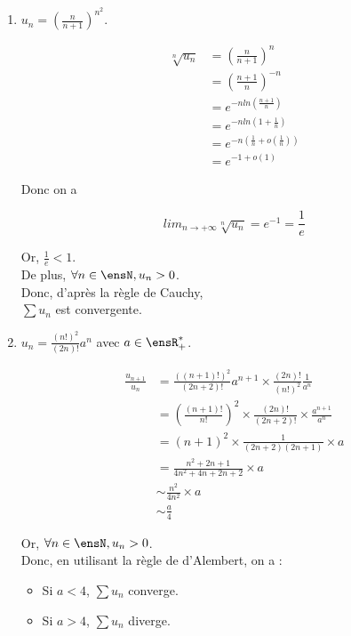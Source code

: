 \begin{enumerate}
    \clearpage

    \item $\displaystyle u_n = (\frac{n}{n + 1})^{n^2}$.

    \exobox
    {
        \begin{align*}
            \sqrt[n]{u_n} &= (\frac{n}{n + 1})^n \\
            &= (\frac{n + 1}{n})^{-n} \\
            &= e^{-nln(\frac{n + 1}{n})} \\
            &= e^{-nln(1 + \frac{1}{n})} \\
            &= e^{-n(\frac{1}{n} + o(\frac{1}{n}))} \\
            &= e^{-1 + o(1)}
        \end{align*}

        Donc on a

        $$
            lim_{n \to + \infty} \sqrt[n]{u_n} = e^{-1} = \frac{1}{e}
        $$

        Or, $\frac{1}{e} < 1$. \\
        De plus, $\forall n \in \ensN, u_n > 0$. \\
        Donc, d'après la règle de Cauchy, \\
        $\sum u_n$ est convergente.
    }

    \clearpage
    
    \item $\displaystyle u_n = \frac{(n!)^2}{(2n)!} a^n$ avec $a \in \ensR_+^*$.

    \exobox
    {
        \begin{align*}
            \frac{u_{n + 1}}{u_n} &= \frac{((n + 1)!)^2}{(2n + 2)!} a^{n + 1} \times \frac{(2n)!}{(n!)^2} \frac{1}{a^n} \\
            &= (\frac{(n + 1)!}{n!})^2 \times \frac{(2n)!}{(2n + 2)!} \times \frac{a^{n + 1}}{a^n} \\
            &= (n + 1)^2 \times \frac{1}{(2n + 2)(2n + 1)} \times a \\
            &= \frac{n^2 + 2n + 1}{4n^2 + 4n + 2n + 2} \times a \\
            &\sim \frac{n^2}{4n^2} \times a \\
            &\sim \frac{a}{4}
        \end{align*}

        Or, $\forall n \in \ensN, u_n > 0$. \\
        Donc, en utilisant la règle de d'Alembert, on a :

        \begin{itemize}
            \item Si $a < 4$, $\sum u_n$ converge.
            \item Si $a > 4$, $\sum u_n$ diverge.
        \end{itemize}

}
\end{enumerate}
